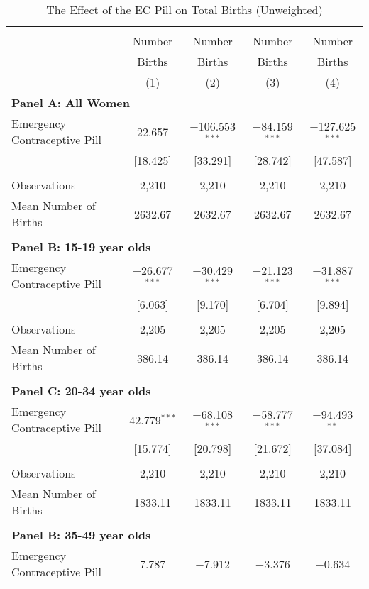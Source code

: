 \begin{table}[!htbp] \centering
\caption{The Effect of the EC Pill on Total Births (Unweighted)}
\label{TEENtab:aggregateunweight}
\begin{tabular}{@{\extracolsep{5pt}}lcccc}
\\[-1.8ex]\hline \hline \\[-1.8ex] 
& Number& Number & Number & Number \\
& Births& Births & Births & Births \\
&(1)&(2)&(3)&(4) \\ \hline
\multicolumn{5}{l}{\textbf{
\noindent Panel A: All Women}} \\
Emergency Contraceptive Pill&22.657&$-$106.553$^{***}$&$-$84.159$^{***}$&$-$127.625$^{***}$\\
            &[18.425]&[33.291]&[28.742]&[47.587]\\
 & & & & \\
Observations&2,210&2,210&2,210&2,210\\
Mean Number of Births&2632.67&2632.67&2632.67&2632.67\\
 & & & & \\
\multicolumn{5}{l}{\noindent \textbf{
Panel B: 15-19 year olds}} \\
Emergency Contraceptive Pill&$-$26.677$^{***}$&$-$30.429$^{***}$&$-$21.123$^{***}$&$-$31.887$^{***}$\\
            &[6.063]&[9.170]&[6.704]&[9.894]\\
 & & & & \\
Observations&2,205&2,205&2,205&2,205\\
Mean Number of Births&386.14&386.14&386.14&386.14\\
 & & & & \\
\multicolumn{5}{l}{\noindent \textbf{
Panel C: 20-34 year olds}} \\
Emergency Contraceptive Pill&42.779$^{***}$&$-$68.108$^{***}$&$-$58.777$^{***}$&$-$94.493$^{**}$\\
            &[15.774]&[20.798]&[21.672]&[37.084]\\
 & & & & \\
Observations&2,210&2,210&2,210&2,210\\
Mean Number of Births&1833.11&1833.11&1833.11&1833.11\\
 & & & & \\
\multicolumn{5}{l}{\noindent \textbf{
Panel B: 35-49 year olds}} \\
Emergency Contraceptive Pill&7.787&$-$7.912&$-$3.376&$-$0.634\\

\end{tabular}
\end{table}
